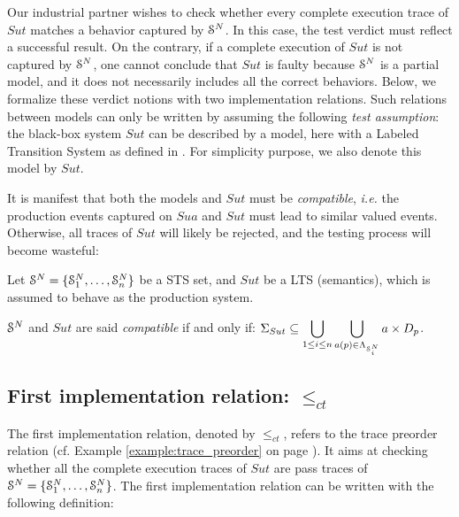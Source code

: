 Our industrial partner wishes to check whether every complete
execution trace of $\mathit{Sut}$ matches a behavior captured by
$\EuScript{S}^{N}$. In this case, the test verdict must reflect a
successful result. On the contrary, if a complete execution of
$\mathit{Sut}$ is not captured by $\EuScript{S}^{N}$, one cannot
conclude that $\mathit{Sut}$ is faulty because $\EuScript{S}^{N}$
is a partial model, and it does not necessarily includes all the
correct behaviors. Below, we formalize these verdict notions
with two implementation relations. Such relations between models
can only be written by assuming the following \emph{test
assumption}: the black-box system $\mathit{Sut}$ can be described
by a model, here with a Labeled Transition System as defined in
. For
simplicity purpose, we also denote this model by $\mathit{Sut}$.

It is manifest that both the models and $\mathit{Sut}$ must be
\emph{compatible}, \emph{i.e.} the production events captured on
$\mathit{Sua}$ and $\mathit{Sut}$ must lead to similar valued
events. Otherwise, all traces of $\mathit{Sut}$ will likely be
rejected, and the testing process will become wasteful:

\begin{definition}
    Let $\EuScript{S}^N = \{ \EuScript{S}_1^N, \dots,
    \EuScript{S}_n^N \}$ be a STS set, and $\mathit{Sut}$ be a LTS
    (semantics), which is assumed to behave as the production
    system.

    $\EuScript{S}^N$ and $\mathit{Sut}$ are said \emph{compatible}
    if and only if: $\displaystyle\Sigma_{Sut} \subseteq \bigcup_{1 \leq i \leq n}
    \bigcup_{a(p) \in \Lambda_{\EuScript{S}_i^N}} a \times D_p$.

    \label{def:similar-sut-sua}
\end{definition}

\subsection{First implementation relation: $\leq_{ct}$}

The first implementation relation, denoted by $\leq_{ct}$, refers
to the trace preorder relation
\cite{DNH84,vaandrager1991relationship} (cf. Example
\ref{example:trace_preorder} on page
\pageref{example:trace_preorder}).
It aims at checking whether all the complete execution traces of
$\mathit{Sut}$ are pass traces of
$\EuScript{S}^{N}=\{\EuScript{S}_1^{N},\dots,\EuScript{S}_n^{N}\}$.
The first implementation relation can be written with the
following definition:

